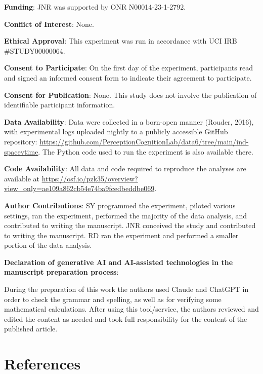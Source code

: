 \documentclass[
  ,man]{apa6}
\begin{document}
\textbf{Funding}: JNR was supported by ONR N00014-23-1-2792.

\textbf{Conflict of Interest}: None.

\textbf{Ethical Approval}: This experiment was run in accordance with UCI IRB \#STUDY00000064.

\textbf{Consent to Participate}: On the first day of the experiment, participants read and signed an informed consent form to indicate their agreement to participate.

\textbf{Consent for Publication}: None. This study does not involve the publication of identifiable participant information.

\textbf{Data Availability}: Data were collected in a born-open manner (Rouder, 2016), with experimental logs uploaded nightly to a publicly accessible GitHub repository: \url{https://github.com/PerceptionCognitionLab/data6/tree/main/ind-spacevtime}. The Python code used to run the experiment is also available there.

\textbf{Code Availability}: All data and code required to reproduce the analyses are available at \url{https://osf.io/pzk35/overview?view_only=ae109a862cb54e74ba9fcedbeddbe069}.

\textbf{Author Contributions}: SY programmed the experiment, piloted various settings, ran the experiment, performed the majority of the data analysis, and contributed to writing the manuscript. JNR conceived the study and contributed to writing the manuscript. RD ran the experiment and performed a smaller portion of the data analysis.

\textbf{Declaration of generative AI and AI-assisted technologies in the manuscript preparation process}:

During the preparation of this work the authors used Claude and ChatGPT in order to check the grammar and spelling, as well as for verifying some mathematical calculations. After using this tool/service, the authors reviewed and edited the content as needed and took full responsibility for the content of the published article.

\newpage

\section*{References}\label{references}
\end{document}
